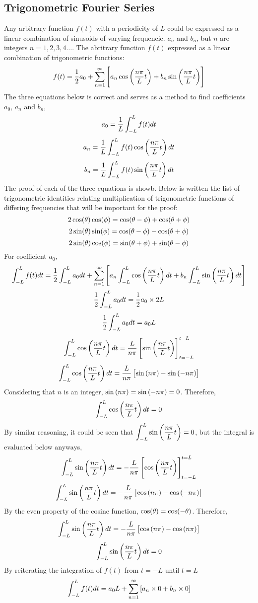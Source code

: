 \documentclass[class=report, 12pt, crop=false]{standalone}
\begin{document}
\begin{center}
\section{Trigonometric Fourier Series}
\begin{comment}
\end{comment}
Any arbitrary function $f(t)$ with a periodicity of $L$ could be expressed as a linear combination of sinusoids of varying frequencie. $a_n$ and $b_n$, but $n$ are integers $n = 1,2,3,4\dots$. The abritrary function $f(t)$ expressed as a linear combination of trigonometric functions:
$$f(t) = \frac{1}{2}a_0 + \sum_{n = 1}^{\infty}\left[a_n \cos\left(\frac{n\pi}{L}t\right) + b_n \sin\left(\frac{n\pi}{L}t\right)\right]$$
The three equations below is correct and serves as a method to find coefficients $a_0$, $a_n$ and $b_n$,
$$a_0 = \frac{1}{L}\int_{-L}^{L}f(t)dt$$
$$a_n = \frac{1}{L}\int_{-L}^{L}f(t)\cos\left(\frac{n\pi}{L}t\right)dt$$
$$b_n = \frac{1}{L}\int_{-L}^{L}f(t)\sin\left(\frac{n\pi}{L}t\right)dt$$
The proof of each of the three equations is showb. Below is written the list of trigonometric identities relating multiplication of trigonometric functions of differing frequencies that will be important for the proof:
$$2\cos(\theta)\cos(\phi) = \cos(\theta - \phi) + \cos(\theta + \phi)$$ 
$$2\sin(\theta)\sin(\phi) = \cos(\theta - \phi) - \cos(\theta + \phi)$$
$$2\sin(\theta)\cos(\phi) = \sin(\theta + \phi) + \sin(\theta - \phi)$$
For coefficient $a_0$,
$$\int_{-L}^{L}f(t)dt = \frac{1}{2} \int_{-L}^{L}a_0dt + \sum_{n = 1}^{\infty}\left[a_n \int_{-L}^{L}\cos\left(\frac{n\pi}{L}t\right)dt + b_n \int_{-L}^{L}\sin\left(\frac{n\pi}{L}t\right)dt\right]$$
$$\frac{1}{2} \int_{-L}^{L}a_0dt = \frac{1}{2}a_0\times2L$$
$$\frac{1}{2} \int_{-L}^{L}a_0dt = a_0L$$
$$\int_{-L}^{L}\cos\left(\frac{n\pi}{L}t\right)dt = \frac{L}{n\pi}\left[\sin\left(\frac{n\pi}{L}t\right)\right]^{t = L}_{t = -L}$$
$$\int_{-L}^{L}\cos\left(\frac{n\pi}{L}t\right)dt = \frac{L}{n\pi}\left[\sin\left(n\pi\right) - \sin\left(-n\pi\right)\right]$$
Considering that $n$ is an integer, $\sin\left(n\pi\right) = \sin\left(-n\pi\right) = 0$. Therefore, 
$$\int_{-L}^{L}\cos\left(\frac{n\pi}{L}t\right)dt = 0$$
By similar reasoning, it could be seen that $\displaystyle{\int_{-L}^{L}\sin\left(\frac{n\pi}{L}t\right) = 0}$, but the integral is evaluated below anyways,
$$\int_{-L}^{L}\sin\left(\frac{n\pi}{L}t\right)dt = -\frac{L}{n\pi}\left[\cos\left(\frac{n\pi}{L}t\right)\right]^{t = L}_{t = -L}$$
$$\int_{-L}^{L}\sin\left(\frac{n\pi}{L}t\right)dt = -\frac{L}{n\pi}\left[\cos\left(n\pi\right) - \cos\left(-n\pi\right)\right]$$
By the even property of the cosine function, $\cos(\theta) = \cos(-\theta)$. Therefore,
$$\int_{-L}^{L}\sin\left(\frac{n\pi}{L}t\right)dt = -\frac{L}{n\pi}\left[\cos\left(n\pi\right) - \cos\left(n\pi\right)\right]$$
$$\int_{-L}^{L}\sin\left(\frac{n\pi}{L}t\right)dt = 0$$
By reiterating the integration of $f(t)$ from $t = -L$ until $t = L$
$$\int_{-L}^{L}f(t)dt = a_0L + \sum_{n = 1}^{\infty}\left[a_n\times 0 + b_n \times 0\right]$$

\end{center}
\end{document}
